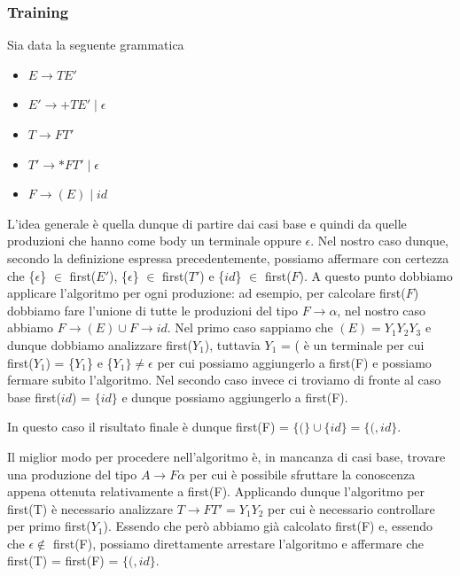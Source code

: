 \documentclass[class=book, crop=false, oneside, 12pt]{standalone}
\begin{document}
\subsubsection{Training}

Sia data la seguente grammatica

\begin{itemize}
    \item[] \(E \rightarrow TE'\)
    \item[] \(E' \rightarrow +TE' \mid \epsilon\)
    \item[] \(T \rightarrow FT'\)
    \item[] \(T' \rightarrow *FT' \mid \epsilon\)
    \item[] \(F \rightarrow (E) \mid id\)
\end{itemize}

L'idea generale è quella dunque di partire dai casi base e quindi da quelle produzioni che hanno come body un terminale oppure \(\epsilon\). Nel nostro caso dunque, secondo la definizione espressa precedentemente, possiamo affermare con certezza che \{\(\epsilon\)\} \(\in\) first(\(E'\)), \{\(\epsilon\)\} \(\in\) first(\(T'\)) e \{\(id\)\} \(\in\) first(\(F\)). A questo punto dobbiamo applicare l'algoritmo per ogni produzione: ad esempio, per calcolare first(\(F\)) dobbiamo fare l'unione di tutte le produzioni del tipo \(F \rightarrow \alpha\), nel nostro caso abbiamo \(F \rightarrow (E) \cup F \rightarrow id\). Nel primo caso sappiamo che \((E) = Y_1Y_2Y_3\) e dunque dobbiamo analizzare first(\(Y_1\)), tuttavia \(Y_1\) = ( è un terminale per cui first(\(Y_1\)) = \{\(Y_1\)\} e \{\(Y_1\} \neq \epsilon\) per cui possiamo aggiungerlo a first(F) e possiamo fermare subito l'algoritmo. Nel secondo caso invece ci troviamo di fronte al caso base first(\(id\)) = \(\{id\}\) e dunque possiamo aggiungerlo a first(F).

In questo caso il risultato finale è dunque first(F) = \(\{(\} \cup \{id\} = \{(, id\}\).

Il miglior modo per procedere nell'algoritmo è, in mancanza di casi base, trovare una produzione del tipo \(A \rightarrow F\alpha\) per cui è possibile sfruttare la conoscenza appena ottenuta relativamente a first(F). Applicando dunque l'algoritmo per first(T) è necessario analizzare \(T \rightarrow FT' = Y_1Y_2\) per cui è necessario controllare per primo first(\(Y_1\)). Essendo che però abbiamo già calcolato first(F) e, essendo che \(\epsilon \notin\) first(F), possiamo direttamente arrestare l'algoritmo e affermare che first(T) = first(F) = \(\{(, id\}\).
\end{document}
